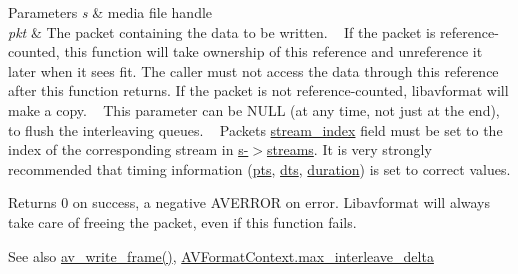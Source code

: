 \begin{DoxyParams}{Parameters}
{\em s} & media file handle \\
\hline
{\em pkt} & The packet containing the data to be written. ~\newline
 If the packet is reference-\/counted, this function will take ownership of this reference and unreference it later when it sees fit. The caller must not access the data through this reference after this function returns. If the packet is not reference-\/counted, libavformat will make a copy. ~\newline
 This parameter can be N\+U\+LL (at any time, not just at the end), to flush the interleaving queues. ~\newline
 Packet\textquotesingle{}s \hyperlink{struct_a_v_packet_a0d1cb9b5a32b00fb6edc81ea3aae2a49}{stream\+\_\+index} field must be set to the index of the corresponding stream in \hyperlink{struct_a_v_format_context_acfefb6b6cf21e87a0dcbd1a547ba2348}{s-\/$>$streams}. It is very strongly recommended that timing information (\hyperlink{struct_a_v_packet_a73bde0a37f3b1efc839f11295bfbf42a}{pts}, \hyperlink{struct_a_v_packet_a85dbbd306b44b02390cd91c45e6a0f76}{dts}, \hyperlink{struct_a_v_packet_af151ba1967c37038088883cd544eeacd}{duration}) is set to correct values.\\
\hline
\end{DoxyParams}
\begin{DoxyReturn}{Returns}
0 on success, a negative A\+V\+E\+R\+R\+OR on error. Libavformat will always take care of freeing the packet, even if this function fails.
\end{DoxyReturn}
\begin{DoxySeeAlso}{See also}
\hyperlink{group__lavf__encoding_gaa85cc1774f18f306cd20a40fc50d0b36}{av\+\_\+write\+\_\+frame()}, \hyperlink{struct_a_v_format_context_a00edb6b7a31f8dabfa668334ca1f92d7}{A\+V\+Format\+Context.\+max\+\_\+interleave\+\_\+delta} 
\end{DoxySeeAlso}

